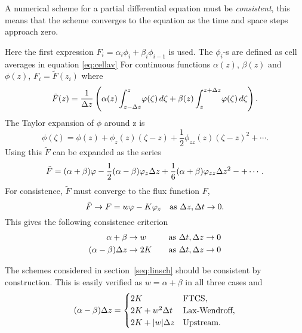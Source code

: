 A numerical scheme for a partial differential equation must be 
\emph{consistent}, this means that the scheme converges to the equation
as the time and space steps approach zero.

Here the first expression $F_i = \alpha_i \phi_i + \beta_i \phi_{i-1}$
is used. The $\phi_i$-s are defined as cell averages in 
equation \ref{eq:cellav}
For continuous functions  $\alpha(z)$, $\beta(z)$ and
$\phi(z)$, $F_i = \tilde{F}(z_i)$ where
\begin{equation}
  \tilde{F}(z) = \frac{1}{\Delta z}
      \left( \alpha(z) \int_{z-\Delta z}^z\!\varphi(\zeta)\,d\zeta 
        +    \beta(z)  \int_z^{z+\Delta z}\!\varphi(\zeta)\,d\zeta \right) .
\end{equation}
The Taylor expansion of $\phi$ around z is
\begin{equation}
   \phi(\zeta) = \phi(z) + \phi_z(z)(\zeta-z) 
        + \frac{1}{2}\phi_{zz}(z)(\zeta-z)^2 + \cdots .
\end{equation}
Using this $\tilde{F}$ can be expanded as the series
\begin{equation}
  \tilde{F} = (\alpha + \beta) \varphi 
       - \frac{1}{2} (\alpha - \beta) \varphi_z \Delta z
       + \frac{1}{6} (\alpha + \beta) \varphi_{zz} \Delta z^2 - +  \cdots .
\end{equation}
For consistence, $\tilde{F}$ must converge
to the flux function $F$,
\begin{equation} 
  \tilde{F} \rightarrow 
  F = w \varphi - K \varphi_z \quad \text{as $\Delta z, \Delta t \rightarrow 0$}.
\end{equation}
This gives the following consistence criterion 
\begin{alignat}{2}
     \alpha + \beta &\rightarrow w \quad 
                &\text{as $\Delta t, \Delta z \rightarrow 0$} \\
     (\alpha - \beta) \Delta z &\rightarrow 2 K \quad 
                &\text{as $\Delta t, \Delta z \rightarrow  0$} 
\end{alignat}

The schemes considered in section~\ref{seq:linsch} should be consistent
by construction.  This is easily verified as $w = \alpha + \beta$ in all
three cases and \begin{equation} (\alpha - \beta)\Delta z =
  \begin{cases}
    2 K  &  \text{FTCS}, \\
    2 K + w^2 \Delta t & \text{Lax-Wendroff},  \\
    2 K + |w| \Delta z & \text{Upstream}.
  \end{cases}
\end{equation}



